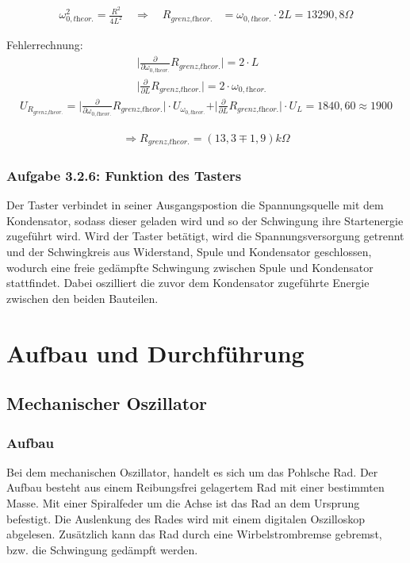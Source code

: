 \documentclass[a4paper]{scrartcl}
\numberwithin{equation}{subsection}
\begin{document}
\begin{align}
\omega_{0,\textit{theor.}}^2 = \frac{R^2}{4L^2} \quad \Rightarrow \quad R_{\textit{grenz,theor.}} &= \omega_{0,\textit{theor.}} \cdot 2L = 13290,8 \Omega
\end{align}


Fehlerrechnung:
\begin{align*}
\vert \frac{\partial}{\partial \omega_{0,\textit{theor.}}}R_{\textit{grenz,theor.}}\vert = 2 \cdot L &\\
\vert \frac{\partial}{\partial L}R_{\textit{grenz,theor.}}\vert = 2 \cdot \omega_{0,\textit{theor.}} &
\end{align*}
\begin{align*}
U_{R_{\textit{grenz,theor.}}} = \vert \frac{\partial}{\partial \omega_{0,\textit{theor.}}}R_{\textit{grenz,theor.}}\vert \cdot U_{\omega_{0,\textit{theor.}}} + \vert \frac{\partial}{\partial L}R_{\textit{grenz,theor.}}\vert \cdot U_L = 1840,60 \approx 1900 
\end{align*}

\begin{align*}
\Rightarrow R_{\textit{grenz,theor.}} = (13,3 \mp 1,9) k \Omega
\end{align*}

\subsubsection{Aufgabe 3.2.6: Funktion des Tasters}
Der Taster verbindet in seiner Ausgangspostion die Spannungsquelle mit dem Kondensator, sodass dieser geladen wird und so der Schwingung ihre Startenergie zugeführt wird. Wird der Taster betätigt, wird die Spannungsversorgung getrennt und der Schwingkreis aus Widerstand, Spule und Kondensator geschlossen, wodurch eine freie gedämpfte Schwingung zwischen Spule und Kondensator stattfindet. Dabei oszilliert die zuvor dem Kondensator zugeführte Energie zwischen den beiden Bauteilen.

\newpage

\section{Aufbau und Durchführung}
\subsection{Mechanischer Oszillator}
\subsubsection{Aufbau}
Bei dem mechanischen Oszillator, handelt es sich um das Pohlsche Rad.
Der Aufbau besteht aus einem Reibungsfrei gelagertem Rad mit einer bestimmten Masse.
Mit einer Spiralfeder um die Achse ist das Rad an dem Ursprung befestigt.
Die Auslenkung des Rades wird mit einem digitalen Oszilloskop abgelesen.
Zusätzlich kann das Rad durch eine Wirbelstrombremse gebremst, bzw. die Schwingung gedämpft werden.
\end{document}
